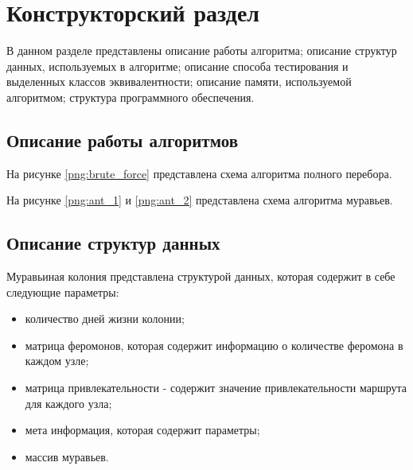 \chapter{Конструкторский раздел}

В данном разделе представлены описание работы алгоритма; описание структур данных, используемых в алгоритме; описание способа тестирования и выделенных классов эквивалентности; описание памяти, используемой алгоритмом; структура программного обеспечения.

\section{Описание работы алгоритмов}
На рисунке \ref{png:brute_force} представлена схема алгоритма полного перебора.
\begin{figure}[H]
\end{figure}

\newpage
На рисунке \ref{png:ant_1} и  \ref{png:ant_2} представлена схема алгоритма муравьев.
\begin{figure}[H]
\end{figure}

\begin{figure}[H]
\end{figure}

\section{Описание структур данных}
Муравьиная колония представлена структурой данных, которая содержит в себе следующие параметры:
\begin{itemize}
	\item количество дней жизни колонии;
	\item матрица феромонов, которая содержит информацию о количестве феромона в каждом узле;
	\item матрица привлекательности - содержит значение привлекательности маршрута для каждого узла;
	\item мета информация, которая содержит параметры;
	\item массив муравьев.
\end{itemize}

